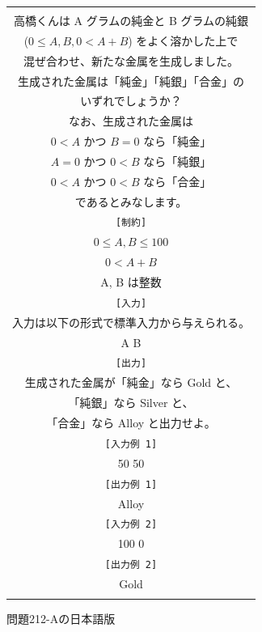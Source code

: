     \begin{figure}[t]
      \begin{tabular}{c}
        \begin{tabularx}{23zw}{l}
          \hline
          \verb|[問題文]| \\
          \textrm{  高橋くんは A グラムの純金と B グラムの純銀} \\
          \textrm{  ($0 \leq A, B, 0 < A+B$) をよく溶かした上で} \\
          \textrm{  混ぜ合わせ、新たな金属を生成しました。} \\
          \textrm{  生成された金属は「純金」「純銀」「合金」の} \\
          \textrm{  いずれでしょうか？} \\
          \textrm{  なお、生成された金属は} \\
          \textrm{  $0 < A$ かつ $B = 0$ なら「純金」} \\
          \textrm{  $A = 0$ かつ $0 < B$ なら「純銀」} \\
          \textrm{  $0 < A$ かつ $0 < B$ なら「合金」} \\
          \textrm{  であるとみなします。} \\
          \verb|[制約]| \\
          \textrm{  $0 \leq A,B \leq 100$} \\
          \textrm{  $0 < A+B$} \\
          \textrm{  A, B は整数} \\
          \verb|[入力]| \\
          \textrm{  入力は以下の形式で標準入力から与えられる。} \\
          \textrm{  A B} \\
          \verb|[出力]| \\
          \textrm{  生成された金属が「純金」なら Gold と、} \\
          \textrm{  「純銀」なら Silver と、} \\
          \textrm{  「合金」なら Alloy と出力せよ。} \\
          \verb|[入力例 1]| \\
          \textrm{  50 50} \\
          \verb|[出力例 1]| \\
          \textrm{  Alloy} \\
          \verb|[入力例 2]| \\
          \textrm{  100 0} \\
          \verb|[出力例 2]| \\
          \textrm{  Gold} \\
          \hline
        \end{tabularx}
      \end{tabular}
      \caption{問題212-Aの日本語版}
      \label{problem_212_A_en}
    \end{figure}

